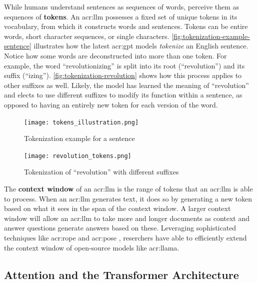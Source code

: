 While humans understand sentences as sequences of words,  perceive them as sequences of \textbf{tokens}. An \acrshort{acr:llm} possesses a fixed set of unique tokens in its vocabulary, from which it constructs words and sentences. Tokens can be entire words, short character sequences, or single characters. \autoref{fig:tokenization-example-sentence} illustrates how the latest \acrshort{acr:gpt} models \textit{tokenize} an English sentence. Notice how some words are deconstructed into more than one token. For example, the word \enquote{revolutionizing} is split into its root (\enquote{revolution}) and its suffix (\enquote{izing}). \autoref{fig:tokenization-revolution} shows how this process applies to other suffixes as well. Likely, the model has learned the meaning of \enquote{revolution} and elects to use different suffixes to modify its function within a sentence, as opposed to having an entirely new token for each version of the word.

\begin{figure}[htp]
    \centering
    \texttt{[image: tokens\_illustration.png]}
    \caption{Tokenization example for a sentence}
    \label{fig:tokenization-example-sentence}
\end{figure}

\begin{figure}[htp]
    \centering
    \texttt{[image: revolution\_tokens.png]}
    \caption{Tokenization of \enquote{revolution} with different suffixes}
    \label{fig:tokenization-revolution}
\end{figure}

The \textbf{context window} of an \acrshort{acr:llm} is the range of tokens that an \acrshort{acr:llm} is able to process. When an \acrshort{acr:llm} generates text, it does so by generating a new token based on what it sees in the span of the context window. A larger context window will allow an \acrshort{acr:llm} to take more and longer documents as context and answer questions generate answers based on these. Leveraging sophisticated techniques like \gls{acr:rope} \citep{suRoFormerEnhancedTransformer2024} and \gls{acr:pose} \citep{zhuPoSEEfficientContext2024}, reserchers have able to efficiently extend the context window of open-source models like \acrshort{acr:llama}.




\subsection{Attention and the Transformer Architecture}
\label{subsec:attention-and-the-transformer-architecture}

